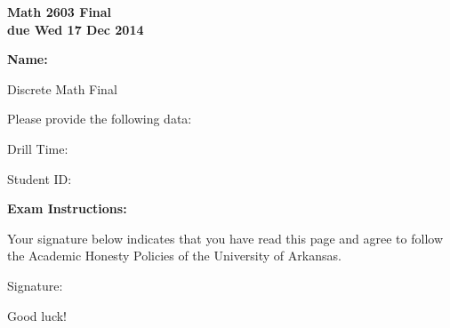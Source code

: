\documentclass[12pt,letterpaper]{article}
\begin{document}
\flushleft
\begin{multicols}{2}

\begin{large}\textbf{Math 2603 Final \\
due Wed 17 Dec 2014}\end{large}

\hfill\textbf{Name:  }\underline{\hspace{35ex}} %
\\
\vspace{.5in}

\end{multicols}

\pagestyle{empty}

\vspace{4pc}

\begin{center}\LARGE Discrete Math Final \end{center}

\vspace{2pc}
Please provide the following data:

\vspace{2pc}
Drill Time: \underline{\hspace{40ex}}

\vspace{2pc}
Student ID: \underline{\hspace{40ex}}

\vspace{3pc}
{\bf Exam Instructions:} %

\vspace{5pc}
Your signature below indicates that you have read this page and agree to follow the Academic Honesty Policies of the University of Arkansas.  

\vspace{3pc}
Signature: \underline{\hspace{79ex}}

\vfill
\begin{flushright}\Large Good luck!\end{flushright}
\end{document}
